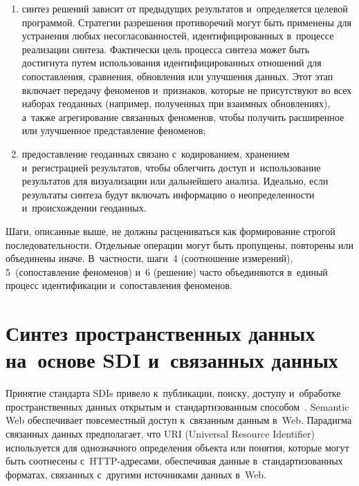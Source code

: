 \begin{multicols}{2}
\begin{enumerate}[(1)]
\item синтез решений зависит от предыду\-щих результатов и~определяется 
целевой программой. Стратегии разрешения противоречий могут быть 
применены для устранения любых несогласованностей, 
идентифицированных в~процессе реализации синтеза. Фактически цель 
процесса синтеза может быть достигнута путем использования 
идентифицированных отношений для сопоставления, сравнения, обновления 
или улучшения данных. Этот этап включает передачу феноменов 
и~признаков, которые не присутствуют во всех наборах геоданных 
(например, полученных при взаимных обновлениях), а~также агрегирование 
связанных феноменов, чтобы получить расширенное или улучшенное 
представление феноменов;
\item предоставление геоданных связано с~кодированием, хранением 
и~регистрацией результатов, чтобы облегчить доступ и~использование 
результатов для визуализации или дальнейшего анализа. Идеально, если 
результаты синтеза будут включать информацию о неопределенности 
и~происхождении геоданных.
\end{enumerate}
     
     Шаги, описанные выше, не должны расцениваться как формирование 
строгой последовательности. Отдельные операции могут быть пропущены, 
повторены или объединены иначе. В~частности, шаги~4 (соотношение 
измерений), 5~(со\-по\-став\-ле\-ние феноменов) и~6 (решение) часто 
объединяются в~единый процесс идентификации и~сопоставления феноменов.
     
\section{Синтез пространственных данных на~основе SDI 
и~связанных данных}
     
     Принятие стандарта SDIs привело к~публикации, поиску, доступу 
и~обработке пространственных данных открытым и~стандартизованным\linebreak 
способом~\cite{14-dul}. Semantic Web обеспечивает повсеместный доступ 
к~связанным данным в~Web. Парадигма связанных данных предполагает, что 
URI (Universal Resource Identifier) используется для однозначного определения объекта или понятия, которые 
могут быть соотнесены с~HTTP-ад\-ре\-са\-ми, обеспечивая данные 
в~стандартизованных форматах, связанных с~другими источниками 
данных в~Web.
     

\end{multicols}
